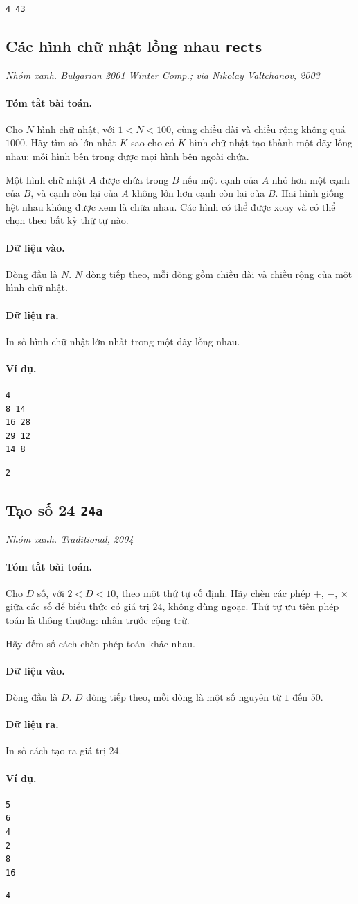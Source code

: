 \documentclass[11pt]{article}
\newcommand{\problem}[4]{%
  \subsection[#1 (#2)]{#1 \hfill {\normalsize\texttt{#2}}}%
  \noindent\textit{#3. #4}\par\smallskip
}
\newcommand{\iosec}[1]{\paragraph{#1}}
\begin{document}
\begin{verbatim}
4 43
\end{verbatim}

\problem{Các hình chữ nhật lồng nhau}{rects}{Nhóm xanh}{Bulgarian 2001 Winter Comp.; via Nikolay Valtchanov, 2003}

\iosec{Tóm tắt bài toán.}
Cho \(N\) hình chữ nhật, với \(1<N<100\), cùng chiều dài và chiều rộng không
quá \(1000\). Hãy tìm số lớn nhất \(K\) sao cho có \(K\) hình chữ nhật tạo
thành một dãy lồng nhau: mỗi hình bên trong được mọi hình bên ngoài chứa.

Một hình chữ nhật \(A\) được chứa trong \(B\) nếu một cạnh của \(A\) nhỏ hơn
một cạnh của \(B\), và cạnh còn lại của \(A\) không lớn hơn cạnh còn lại của
\(B\). Hai hình giống hệt nhau không được xem là chứa nhau. Các hình có thể
được xoay và có thể chọn theo bất kỳ thứ tự nào.

\iosec{Dữ liệu vào.}
Dòng đầu là \(N\). \(N\) dòng tiếp theo, mỗi dòng gồm chiều dài và chiều rộng
của một hình chữ nhật.

\iosec{Dữ liệu ra.}
In số hình chữ nhật lớn nhất trong một dãy lồng nhau.

\iosec{Ví dụ.}
\begin{verbatim}
4
8 14
16 28
29 12
14 8
\end{verbatim}

\begin{verbatim}
2
\end{verbatim}

\problem{Tạo số 24}{24a}{Nhóm xanh}{Traditional, 2004}

\iosec{Tóm tắt bài toán.}
Cho \(D\) số, với \(2<D<10\), theo một thứ tự cố định. Hãy chèn các phép
\(+\), \(-\), \(\times\) giữa các số để biểu thức có giá trị \(24\), không
dùng ngoặc. Thứ tự ưu tiên phép toán là thông thường: nhân trước cộng trừ.

Hãy đếm số cách chèn phép toán khác nhau.

\iosec{Dữ liệu vào.}
Dòng đầu là \(D\). \(D\) dòng tiếp theo, mỗi dòng là một số nguyên từ \(1\) đến
\(50\).

\iosec{Dữ liệu ra.}
In số cách tạo ra giá trị \(24\).

\iosec{Ví dụ.}
\begin{verbatim}
5
6
4
2
8
16
\end{verbatim}

\begin{verbatim}
4
\end{verbatim}
\end{document}

